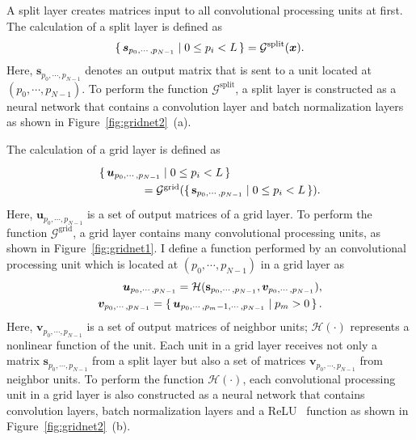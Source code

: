 \documentclass[10pt,twocolumn,letterpaper]{article}
\begin{document}
A split layer creates matrices input to all convolutional processing units at first.
The calculation of a split layer is defined as
\begin{eqnarray}
\set{{\bm s}_{p_0,\cdots,p_{N-1}} \mid 0 \leq p_i < L} = \mathcal{G}^{\textrm{split}}({\bm x}).
\end{eqnarray}
Here, ${\bm s}_{p_0,\cdots,p_{N-1}}$ denotes an output matrix that is sent to a unit located at $(p_0,\cdots,p_{N-1})$.
To perform the function $\mathcal{G}^{\textrm{split}}$, a split layer is constructed as a neural network that contains a convolution layer and batch normalization layers~\cite{BatchNormalization} as shown in Figure~\ref{fig:gridnet2}~(a).

The calculation of a grid layer is defined as
\begin{eqnarray}
\renewcommand{\arraystretch}{1.3}
\begin{array}{l}
 \set{{\bm u}_{p_0,\cdots,p_{N-1}} \mid 0 \leq p_i < L} \\
\quad\quad\quad\quad = \mathcal{G}^{\textrm{grid}}(\set{{\bf s}_{p_0,\cdots,p_{N-1}} \mid 0 \leq p_i < L}).
\end{array}
\renewcommand{\arraystretch}{1}
\end{eqnarray}
Here, ${\bm u}_{p_0,\cdots,p_{N-1}}$ is a set of output matrices of a grid layer.
To perform the function $\mathcal{G}^{\textrm{grid}}$, a grid layer contains many convolutional processing units, as shown in Figure~\ref{fig:gridnet1}.
I define a function performed by an convolutional processing unit which is located at $(p_0,\cdots,p_{N-1})$ in a grid layer as
\begin{eqnarray}{\bm u}_{p_0,\cdots,p_{N-1}} = \mathcal{H}({\bf s}_{p_0,\cdots,p_{N-1}}, {\bm v}_{p_0,\cdots,p_{N-1}}), \\
 {\bm v}_{p_0,\cdots,p_{N-1}} = \set{ \bm{u}_{p_0,\cdots,p_m-1,\cdots,p_{N-1}} \mid p_m > 0}.
\end{eqnarray}
Here, ${\bm v}_{p_0,\cdots,p_{N-1}}$ is a set of output matrices of neighbor units;
$\mathcal{H}(\cdot)$ represents a nonlinear function of the unit.
Each unit in a grid layer receives not only a matrix ${\bm s}_{p_0,\cdots,p_{N-1}}$ from a split layer but also a set of matrices ${\bm v}_{p_0,\cdots,p_{N-1}}$ from neighbor units.
To perform the function $\mathcal{H}(\cdot)$, each convolutional processing unit in a grid layer is also constructed as a neural network that contains convolution layers, batch normalization layers and a ReLU~\cite{ReLU} function as shown in Figure~\ref{fig:gridnet2}~(b).
\end{document}
